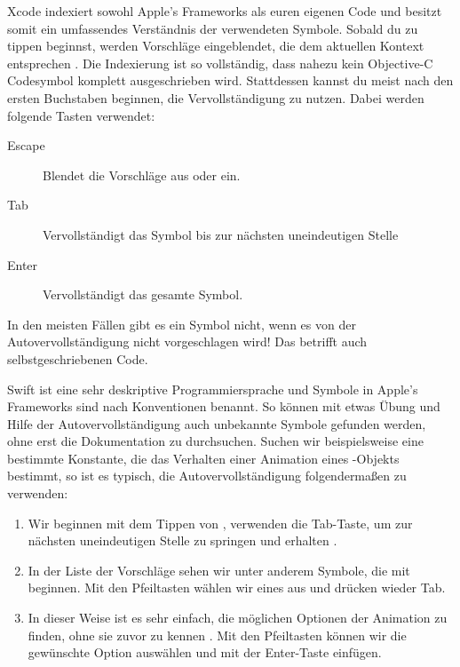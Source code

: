 \documentclass[parskip=half, final]{scrreprt}
\begin{document}
Xcode indexiert sowohl Apple's Frameworks als euren eigenen Code und besitzt somit ein umfassendes Verständnis der verwendeten Symbole. Sobald du zu tippen beginnst, werden Vorschläge eingeblendet, die dem aktuellen Kontext entsprechen . Die Indexierung ist so vollständig, dass nahezu kein Objective-C Codesymbol komplett ausgeschrieben wird. Stattdessen kannst du meist nach den ersten Buchstaben beginnen, die Vervollständigung zu nutzen. Dabei werden folgende Tasten verwendet:
\begin{description}
\item[Escape] Blendet die Vorschläge aus oder ein.
\item[Tab] Vervollständigt das Symbol bis zur nächsten uneindeutigen Stelle
\item[Enter] Vervollständigt das gesamte Symbol.
\end{description}


In den meisten Fällen gibt es ein Symbol nicht, wenn es von der Autovervollständigung nicht vorgeschlagen wird! Das betrifft auch selbstgeschriebenen Code.

Swift ist eine sehr deskriptive Programmiersprache und Symbole in Apple's Frameworks sind nach Konventionen benannt. So können mit etwas Übung und Hilfe der Autovervollständigung auch unbekannte Symbole gefunden werden, ohne erst die Dokumentation zu durchsuchen. Suchen wir beispielsweise eine bestimmte Konstante, die das Verhalten einer Animation eines -Objekts bestimmt, so ist es typisch, die Autovervollständigung folgendermaßen zu verwenden:
\begin{enumerate}
\item Wir beginnen mit dem Tippen von , verwenden die Tab-Taste, um zur nächsten uneindeutigen Stelle zu springen und erhalten .
\item In der Liste der Vorschläge sehen wir unter anderem Symbole, die mit  beginnen. Mit den Pfeiltasten wählen wir eines aus und drücken wieder Tab.
\item In dieser Weise ist es sehr einfach, die möglichen Optionen der Animation zu finden, ohne sie zuvor zu kennen . Mit den Pfeiltasten können wir die gewünschte Option auswählen und mit der Enter-Taste einfügen.
\end{enumerate}
\end{document}
